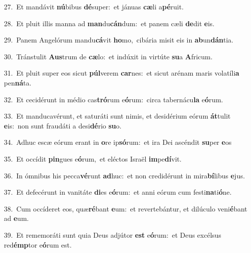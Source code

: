 {\numbfont\textcolor{\numbcolor}{27.}}~Et mandávit \textbf{nú}\-bibus \textbf{dé}\-super:~\star et jánuas \textbf{cæ}\-li a\-\textbf{pé}\-ruit.\par
{\numbfont\textcolor{\numbcolor}{28.}}~Et pluit illis manna ad \textbf{man}\-du\-\textbf{cán}\-dum:~\star et panem cæli \textbf{de}\-dit \textbf{e}\-is.\par
{\numbfont\textcolor{\numbcolor}{29.}}~Panem Angelórum mandu\-\textbf{cá}\-vit \textbf{ho}\-mo,~\star cibária misit eis in \textbf{ab}\-un\-\textbf{dán}\-tia.\par
{\numbfont\textcolor{\numbcolor}{30.}}~Tránstulit \textbf{Aus}\-trum de \textbf{cæ}\-lo:~\star et indúxit in virtúte \textbf{su}\-a \textbf{A}\-fricum.\par
{\numbfont\textcolor{\numbcolor}{31.}}~Et pluit super eos sicut \textbf{púl}\-verem \textbf{car}\-nes:~\star et sicut arénam maris volatíli\textbf{a} pen\-\textbf{ná}\-ta.\par
{\numbfont\textcolor{\numbcolor}{32.}}~Et cecidérunt in médio cas\-\textbf{tró}\-rum e\-\textbf{ó}\-rum:~\star circa tabernácu\textbf{la} e\-\textbf{ó}\-rum.\par
{\numbfont\textcolor{\numbcolor}{33.}}~Et manducavérunt, et saturáti sunt nimis, et desidérium eórum \textbf{át}\-tulit \textbf{e}\-is:~\star non sunt fraudáti a desi\-\textbf{dé}\-rio \textbf{su}\-o.\par
{\numbfont\textcolor{\numbcolor}{34.}}~Adhuc escæ eórum erant in \textbf{o}\-re ip\-\textbf{só}\-rum:~\star et ira Dei ascéndit \textbf{su}\-per \textbf{e}\-os\par
{\numbfont\textcolor{\numbcolor}{35.}}~Et occídit \textbf{pin}\-gues e\-\textbf{ó}\-rum,~\star et eléctos Israël \textbf{im}\-pe\-\textbf{dí}\-vit.\par
{\numbfont\textcolor{\numbcolor}{36.}}~In ómnibus his pecca\-\textbf{vé}\-runt \textbf{ad}\-huc:~\star et non credidérunt in mira\-\textbf{bí}\-libus \textbf{e}\-jus.\par
{\numbfont\textcolor{\numbcolor}{37.}}~Et defecérunt in vanitáte \textbf{di}\-es e\-\textbf{ó}\-rum:~\star et anni eórum cum festi\-\textbf{na}\-ti\-\textbf{ó}\-ne.\par
{\numbfont\textcolor{\numbcolor}{38.}}~Cum occíderet eos, quæ\-\textbf{ré}\-bant \textbf{e}\-um:~\star et revertebántur, et dilúculo veni\-\textbf{é}\-bant ad \textbf{e}\-um.\par
{\numbfont\textcolor{\numbcolor}{39.}}~Et rememoráti sunt quia Deus adjútor \textbf{est} e\-\textbf{ó}\-rum:~\star et Deus excélsus red\-\textbf{émp}\-tor e\-\textbf{ó}\-rum est.\par
